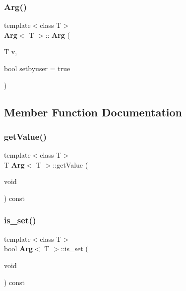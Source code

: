 \mbox{\label{classArg_a286252c45fe2cb504f545d8efa56c721}} 
\subsubsection{Arg()\hspace{0.1cm}{\footnotesize\ttfamily [2/2]}}
{\footnotesize\ttfamily template$<$class T$>$ \\
\textbf{ Arg}$<$ T $>$\+::\textbf{ Arg} (\begin{DoxyParamCaption}\item[{T}]{v,  }\item[{bool}]{setbyuser = {\ttfamily true} }\end{DoxyParamCaption})}



\subsection{Member Function Documentation}
\mbox{\label{classArg_af7cbecbbda58e605f3faf2bb767b706a}} 
\subsubsection{get\+Value()}
{\footnotesize\ttfamily template$<$class T$>$ \\
T \textbf{ Arg}$<$ T $>$\+::get\+Value (\begin{DoxyParamCaption}\item[{void}]{ }\end{DoxyParamCaption}) const\hspace{0.3cm}{\ttfamily [inline]}}

\mbox{\label{classArg_a4b961114bb3919ce1607daa1c9d36cdc}} 
\subsubsection{is\+\_\+set()}
{\footnotesize\ttfamily template$<$class T$>$ \\
bool \textbf{ Arg}$<$ T $>$\+::is\+\_\+set (\begin{DoxyParamCaption}\item[{void}]{ }\end{DoxyParamCaption}) const\hspace{0.3cm}{\ttfamily [inline]}}

